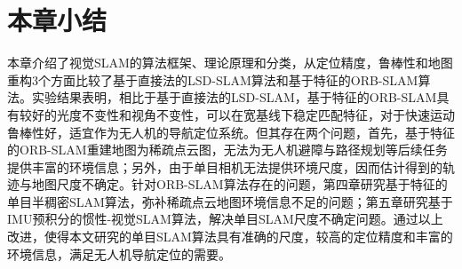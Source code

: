 \section{本章小结}
本章介绍了视觉SLAM的算法框架、理论原理和分类，从定位精度，鲁棒性和地图重构3个方面比较了基于直接法的LSD-SLAM算法和基于特征的ORB-SLAM算法。实验结果表明，相比于基于直接法的LSD-SLAM，基于特征的ORB-SLAM具有较好的光度不变性和视角不变性，可以在宽基线下稳定匹配特征，对于快速运动鲁棒性好，适宜作为无人机的导航定位系统。但其存在两个问题，首先，基于特征的ORB-SLAM重建地图为稀疏点云图，无法为无人机避障与路径规划等后续任务提供丰富的环境信息；另外，由于单目相机无法提供环境尺度，因而估计得到的轨迹与地图尺度不确定。针对ORB-SLAM算法存在的问题，第四章研究基于特征的单目半稠密SLAM算法，弥补稀疏点云地图环境信息不足的问题；第五章研究基于IMU预积分的惯性-视觉SLAM算法，解决单目SLAM尺度不确定问题。通过以上改进，使得本文研究的单目SLAM算法具有准确的尺度，较高的定位精度和丰富的环境信息，满足无人机导航定位的需要。


